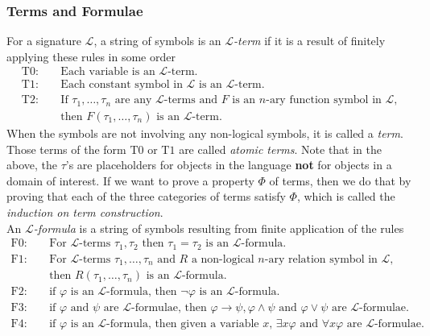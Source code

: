 \subsubsection{Terms and Formulae}
For a signature $\mathcal{L}$, a string of symbols is an \emph{$\mathcal{L}$-term} if it is a result of finitely applying these rules in some order
\begin{align*}
    \mathrm{T0}\colon\quad & \text{Each variable is an } \mathcal{L}\text{-term}.\\
    \mathrm{T1}\colon\quad & \text{Each constant symbol in }\mathcal{L} \text{ is an } \mathcal{L}\text{-term}.\\
    \mathrm{T2}\colon\quad & \text{If } \tau_1,\dots,\tau_n \text{ are any } \mathcal{L}\text{-terms and }F \text{ is an } n \text{-ary function symbol in } \mathcal{L}\text{,}\\
    &\text{then } F(\tau_1,\dots,\tau_n) \text{ is an } \mathcal{L}\text{-term}. 
\end{align*} 
When the symbols are not involving any non-logical symbols, it is called a \emph{term}. Those terms of the form $\mathrm{T0}$ or $\mathrm{T1}$ are called \emph{atomic terms}. Note that in the above, the $\tau$'s are placeholders for objects in the language \textbf{not} for objects in a domain of interest. If we want to prove a property $\Phi$ of terms, then we do that by proving that each of the three categories of terms satisfy $\Phi$, which is called the \emph{induction on term construction}.\\
An \emph{$\mathcal{L}$-formula} is a string of symbols resulting from finite application of the rules
\begin{align*}
    \mathrm{F0}\colon\quad & \text{For } \mathcal{L}\text{-terms } \tau_1,\tau_2\text{ then } \tau_1 = \tau_2\text{ is an } \mathcal{L}\text{-formula.}\\
    \mathrm{F1}\colon\quad & \text{For } \mathcal{L}\text{-terms } \tau_1,\dots,\tau_n \text{ and } R \text{ a non-logical } n\text{-ary relation symbol in }\mathcal{L},\\
     &\text{then } R(\tau_1,\dots,\tau_n) \text{ is an } \mathcal{L}\text{-formula.}\\
     \mathrm{F2}\colon\quad & \text{if }\varphi \text{ is an }\mathcal{L}\text{-formula, then } \neg\varphi \text{ is an }\mathcal{L}\text{-formula.}\\
     \mathrm{F3}\colon\quad & \text{if }\varphi \text{ and } \psi \text{ are } \mathcal{L}\text{-formulae, then } \varphi\to \psi, \varphi\wedge \psi \text{ and } \varphi\vee \psi \text{ are } \mathcal{L}\text{-formulae.}\\
     \mathrm{F4}\colon\quad &  \text{if }\varphi \text{ is an }\mathcal{L}\text{-formula, then given a variable }x\text{, } \exists x\varphi \text{ and } \forall x\varphi \text{ are } \mathcal{L}\text{-formulae.}  
\end{align*}
